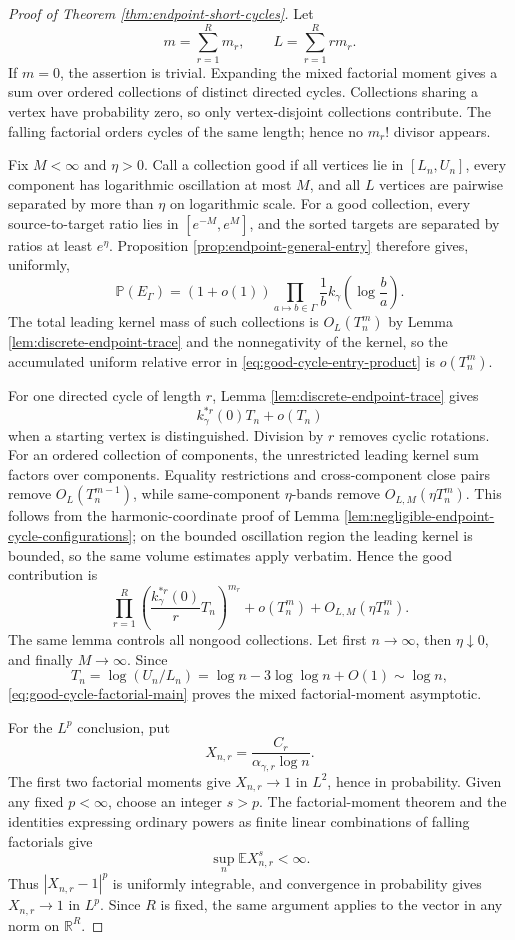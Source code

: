 \documentclass[11pt]{article}
\theoremstyle{remark}
\newcommand{\Pp}{\mathbb P}
\newcommand{\Ee}{\mathbb E}
\begin{document}
\begin{proof}[Proof of Theorem \ref{thm:endpoint-short-cycles}]
Let
\[
        m=\sum_{r=1}^Rm_r,
        \qquad
        L=\sum_{r=1}^Rrm_r.
\]
If $m=0$, the assertion is trivial.  Expanding the mixed factorial moment gives
a sum over ordered collections of distinct directed cycles.  Collections
sharing a vertex have probability zero, so only vertex-disjoint collections
contribute.  The falling factorial orders cycles of the same length; hence no
$m_r!$ divisor appears.

Fix $M<\infty$ and $\eta>0$.  Call a collection good if all vertices lie in
$[L_n,U_n]$, every component has logarithmic oscillation at most $M$, and all
$L$ vertices are pairwise separated by more than $\eta$ on logarithmic scale.
For a good collection, every source-to-target ratio lies in
$[e^{-M},e^M]$, and the sorted targets are separated by ratios at least
$e^\eta$.  Proposition \ref{prop:endpoint-general-entry} therefore gives,
uniformly,
\[
        \Pp(E_\Gamma)
        =(1+o(1))\prod_{a\mapsto b\in\Gamma}
        \frac1b k_\gamma\!\left(\log\frac ba\right).
\tag{10.57}\label{eq:good-cycle-entry-product}
\]
The total leading kernel mass of such collections is $O_L(T_n^m)$ by Lemma
\ref{lem:discrete-endpoint-trace} and the nonnegativity of the kernel, so the
accumulated uniform relative error in
\eqref{eq:good-cycle-entry-product} is $o(T_n^m)$.

For one directed cycle of length $r$, Lemma
\ref{lem:discrete-endpoint-trace} gives
\[
        k_\gamma^{*r}(0)T_n+o(T_n)
\]
when a starting vertex is distinguished.  Division by $r$ removes cyclic
rotations.  For an ordered collection of components, the unrestricted leading
kernel sum factors over components.  Equality restrictions and cross-component
close pairs remove $O_L(T_n^{m-1})$, while same-component $\eta$-bands remove
$O_{L,M}(\eta T_n^m)$.  This follows from the harmonic-coordinate proof of
Lemma \ref{lem:negligible-endpoint-cycle-configurations}; on the bounded
oscillation region the leading kernel is bounded, so the same volume estimates
apply verbatim.  Hence the good
contribution is
\[
        \prod_{r=1}^R
        \left(\frac{k_\gamma^{*r}(0)}rT_n\right)^{m_r}
        +o(T_n^m)+O_{L,M}(\eta T_n^m).
\tag{10.58}\label{eq:good-cycle-factorial-main}
\]
The same lemma controls all nongood collections.  Let first $n\to\infty$, then
$\eta\downarrow0$, and finally $M\to\infty$.  Since
\[
        T_n=\log(U_n/L_n)
        =\log n-3\log\log n+O(1)\sim\log n,
\]
\eqref{eq:good-cycle-factorial-main} proves the mixed factorial-moment
asymptotic.

For the $L^p$ conclusion, put
\[
        X_{n,r}=\frac{C_r}{\alpha_{\gamma,r}\log n}.
\]
The first two factorial moments give $X_{n,r}\to1$ in $L^2$, hence in
probability.  Given any fixed $p<\infty$, choose an integer $s>p$.  The
factorial-moment theorem and the identities expressing ordinary powers as
finite linear combinations of falling factorials give
\[
        \sup_n\Ee X_{n,r}^s<\infty.
\]
Thus $|X_{n,r}-1|^p$ is uniformly integrable, and convergence in probability
gives $X_{n,r}\to1$ in $L^p$.  Since $R$ is fixed, the same argument applies
to the vector in any norm on $\mathbb R^R$.
\end{proof}
\end{document}
